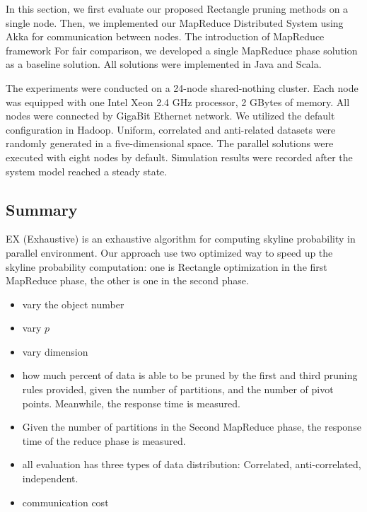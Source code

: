 In this section, we first evaluate our proposed Rectangle pruning methods on a single node. Then, we implemented our MapReduce Distributed System using Akka for communication between nodes. The introduction of MapReduce framework
For fair comparison, we developed a single MapReduce phase solution as a baseline solution. All solutions were implemented in Java and Scala.

The experiments were conducted on a 24-node shared-nothing
cluster. Each node was equipped with one Intel Xeon 2.4 GHz
processor, 2 GBytes of memory. All nodes were connected by GigaBit
Ethernet network. We utilized the default configuration in Hadoop.
Uniform, correlated and anti-related datasets were randomly generated in a
five-dimensional space. The parallel solutions were executed with
eight nodes by default. Simulation results were recorded after the
system model reached a steady state.

\subsection{Summary}
EX (Exhaustive) is an exhaustive algorithm for computing skyline probability in parallel environment. Our approach use two optimized way to speed up the skyline probability computation: one is Rectangle optimization in the first MapReduce phase, the other is one in the second phase.

\begin{itemize}
\item vary the object number

\item vary $p$

\item vary dimension

\item how much percent of data is able to be pruned by the first and third pruning rules provided, given the number of partitions, and the number of pivot points. Meanwhile, the response time is measured.

\item Given the number of partitions in the Second MapReduce phase, the response time of the reduce phase is measured.

\item all evaluation has three types of data distribution: Correlated, anti-correlated, independent.

\item communication cost

\end{itemize}



